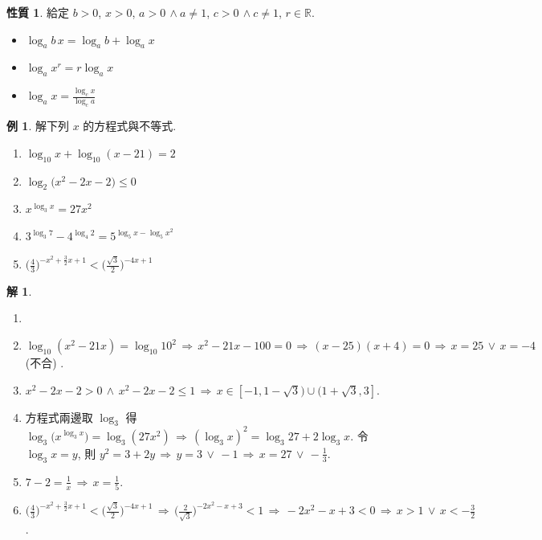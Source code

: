 \documentclass[12pt]{extarticle}
\newcommand{\ds}{\displaystyle}
\newcommand{\ie}{\,\Longrightarrow\,}
\theoremstyle{definition}
\newtheorem*{prp}{性質}
\newtheorem*{ex}{例}
\newtheorem*{sol}{解}
\begin{document}
\begin{prp} 給定 $b > 0$, $x > 0$, $a > 0\,\wedge a\not=1$, $c > 0\,\wedge c\not=1$, $r\in\mathbb{R}$. 
  \setlength{\columnsep}{-0mm}
  \begin{multicols}{3}
    \begin{itemize}\setlength\itemsep{0em}
      \item $\log_a b\,x = \log_a b + \log_a x$
      \item $\ds\log_a x^r = r\log_a x$
      \item $\ds\log_a x = \frac{\log_c x}{\log_c a}$
    \end{itemize}
  \end{multicols}
\end{prp}

\begin{ex} 解下列 $x$ 的方程式與不等式. 
  \setlength{\columnsep}{-0mm}
  \begin{multicols}{2}
    \begin{enumerate}\setlength\itemsep{0em}
      \item $\ds\log_{10} x + \log_{10}(x - 21) = 2$
      \item $\ds\log_2\big(x^2 - 2x - 2\big)\leqslant 0$
      \item $\ds x^{\log_3 x} = 27x^2$
      \item $\ds 3^{\log_3 7} - 4^{\log_4 2} = 5^{\log_5 x - \log_5 x^2}$
      \item $\ds\Big(\frac{4}{3}\Big)^{-x^2 + \frac{3}{2}x + 1} < \Big(\frac{\sqrt{3}}{2}\Big)^{-4x + 1}$
    \end{enumerate}
  \end{multicols}
\end{ex}

\begin{sol}
  \vspace{-0.5em}
  \begin{enumerate}\setlength\itemsep{0em}
    \item[]
    \item $\ds\log_{10} (x^2 - 21 x) = \log_{10} 10^2 \ie x^2 - 21x - 100 = 0 \ie (x - 25)(x + 4) = 0 \ie x = 25\,\vee\,x = -4$ (不合) . 
    \item $\ds x^2 - 2x - 2 > 0\,\wedge\, x^2 - 2x - 2\leqslant 1 \ie x \in [-1, 1 - \sqrt{3})\cup (1 + \sqrt{3}, 3]$.
    \item 方程式兩邊取 $\ds\log_3$ 得 $\ds\log_3\big(x^{\log_3 x}\big) = \log_3(27 x^2) \ie (\log_3 x)^2 = \log_3 27 + 2\log_3 x$. 令 $\ds\log_3 x = y$, 則 $\ds y^2 = 3 + 2y \ie y = 3\,\vee\,-1 \ie x = 27\,\vee\,-\frac{1}{3}$.
    \item $\ds 7 - 2 = \frac{1}{x} \ie x = \frac{1}{5}$. 
    \item $\ds\Big(\frac{4}{3}\Big)^{-x^2 + \frac{3}{2}x + 1} < \Big(\frac{\sqrt{3}}{2}\Big)^{-4x + 1} \ie \Big(\frac{2}{\sqrt{3}}\Big)^{-2x^2 -x + 3} < 1\ie -2x^2 -x + 3 < 0 \ie x > 1\,\vee\,x < -\frac{3}{2}$. 
  \end{enumerate}
\end{sol}
\end{document}
